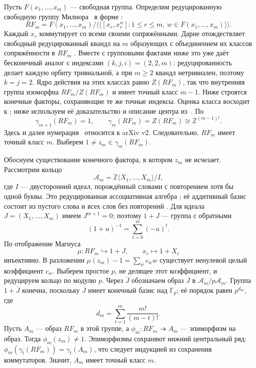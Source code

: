 \documentclass[11pt,a4paper]{article}
\theoremstyle{definition}
\theoremstyle{remark}
\newcommand{\Z}{\mathbb Z}
\newcommand{\F}{\mathbb F}
\begin{document}
Пусть \(F(x_1,\ldots,x_m)\) --- свободная группа.
Определим редуцированную свободную группу Милнора~\cite{Milnor}
в форме \cite[определение~1.2]{Darne}:
\[
 RF_m=F(x_1,\ldots,x_m)/
 \langle\!\langle [x_r,x_r^w]:
 1\le r\le m,\ w\in F(x_1,\ldots,x_m)\rangle\!\rangle.
\]
Каждый \(x_r\) коммутирует со всеми своими сопряжёнными.
Дарне отождествляет свободный редуцированный квандл на \(m\) образующих
с объединением их классов сопряжённости в \(RF_m\)
\cite[предложение~7.10]{DarneNilpotent}.
Вместе с групповыми фактами ниже это уже даёт бесконечный аналог
с индексами \((k,j,i)=(2,2,m)\): редуцированность делает каждую орбиту
тривиальной, а при \(m\ge2\) квандл нетривиален, поэтому \(k=j=2\).
Ядро действия на этих классах равно \(Z(RF_m)\), так что внутренняя
группа изоморфна \(RF_m/Z(RF_m)\) и имеет точный класс \(m-1\).
Ниже строятся конечные факторы,
сохраняющие те же точные индексы.
Оценка класса восходит к \cite[лемма~1.3]{HabeggerLin};
ниже используем её доказательство и описание центра из~\cite{Darne}.
По \cite[предложения~1.3 и~1.18]{Darne}
\[
 \gamma_{m+1}(RF_m)=1,\qquad
 \gamma_m(RF_m)=Z(RF_m)\cong\Z^{(m-1)!}.
\]
Здесь и далее нумерация~\cite{Darne} относится к arXiv v2.
Следовательно, \(RF_m\) имеет точный класс \(m\).
Выберем \(1\ne z_m\in\gamma_m(RF_m)\).

Обоснуем существование конечного фактора,
в котором \(z_m\) не исчезает.
Рассмотрим кольцо
\[
 \mathscr A_m=\Z\langle X_1,\ldots,X_m\rangle/I,
\]
где \(I\) --- двусторонний идеал, порождённый словами
с повторением хотя бы одной буквы. Это редуцированная ассоциативная
алгебра \cite[определение~1.4]{Darne}; её аддитивный базис состоит
из пустого слова и всех слов без повторений \cite[факт~1.5]{Darne}.
Для идеала \(J=(X_1,\ldots,X_m)\) имеем \(J^{m+1}=0\);
поэтому \(1+J\) --- группа с обратными
\[
 (1+u)^{-1}=\sum_{t=0}^{m}(-u)^t.
\]
По \cite[следствие~1.13]{Darne} отображение Магнуса
\[
 \mu:RF_m\hookrightarrow1+J,\qquad x_r\mapsto1+X_r
\]
инъективно.
В разложении \(\mu(z_m)-1=\sum_w c_ww\)
существует ненулевой целый коэффициент \(c_w\).
Выберем простое \(p\), не делящее этот коэффициент,
и редуцируем кольцо по модулю \(p\).
Через \(\overline J\) обозначаем образ \(J\)
в \(\mathscr A_m/p\mathscr A_m\).
Группа \(1+\overline J\) конечна, поскольку \(\overline J\)
имеет конечный базис над \(\F_p\); её порядок равен \(p^{d_m}\), где
\[
 d_m=\sum_{t=1}^{m}\frac{m!}{(m-t)!}.
\]
Пусть \(A_m\) --- образ \(RF_m\) в этой группе,
а \(\phi_m:RF_m\twoheadrightarrow A_m\) --- эпиморфизм на образ.
Тогда \(\phi_m(z_m)\ne1\).
Эпиморфизмы сохраняют нижний центральный ряд:
\(\phi_m(\gamma_t(RF_m))=\gamma_t(A_m)\),
что следует индукцией из сохранения коммутаторов.
Значит, \(A_m\) имеет точный класс \(m\).
\end{document}
